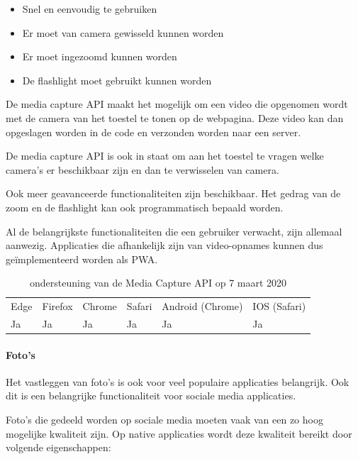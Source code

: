    \begin{itemize}
     \item	Snel en eenvoudig te gebruiken
     \item	Er moet van camera gewisseld kunnen worden
     \item	Er moet ingezoomd kunnen worden
     \item	De flashlight moet gebruikt kunnen worden
   \end{itemize}

De media capture API \autocite{DzungDTran2012}  maakt het mogelijk om een video die opgenomen wordt met de camera van het toestel te tonen op de webpagina. Deze video kan dan opgeslagen worden in de code en verzonden worden naar een server. 
\autocite{Fransson2017}

De media capture API is ook in staat om aan het toestel te vragen welke camera’s er beschikbaar zijn en dan te verwisselen van camera.
\autocite{Scales2020a}

Ook meer geavanceerde functionaliteiten  zijn beschikbaar. Het gedrag van de zoom en de flashlight kan ook programmatisch bepaald worden.
\autocite{Oberhofer2017} \autocite{Ogundipe2018}


Al de belangrijkste functionaliteiten die een gebruiker verwacht, zijn allemaal aanwezig. Applicaties die afhankelijk zijn van video-opnames kunnen dus geïmplementeerd worden als PWA.

\begin{table}[H]
	\centering
	\begin{tabular}{llllll}
		Edge & Firefox & Chrome & Safari & Android (Chrome) & IOS (Safari) \\
		Ja   & Ja      & Ja     & Ja     & Ja               & Ja          
	\end{tabular}	
	\caption{ondersteuning van de Media Capture API op 7 maart 2020}
\end{table}



\paragraph{Foto's }

Het vastleggen van foto's is ook voor veel populaire applicaties belangrijk. Ook dit is een belangrijke functionaliteit voor sociale media applicaties.

Foto's die gedeeld worden op sociale media moeten vaak van een zo hoog mogelijke kwaliteit zijn. Op native applicaties wordt deze kwaliteit bereikt door volgende eigenschappen: 

